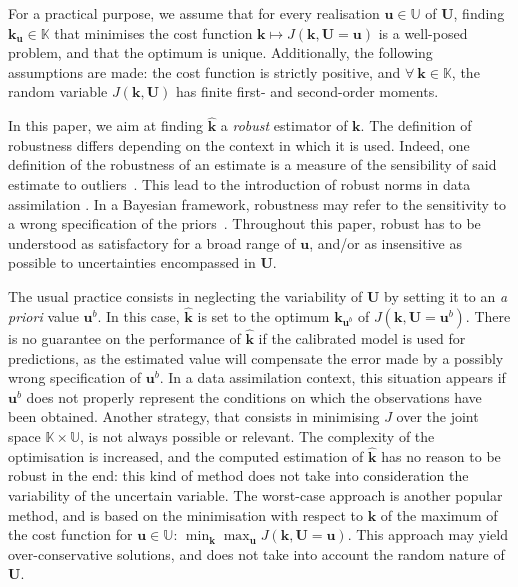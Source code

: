 \documentclass[preprint, review, 1p]{elsarticle}
\newcommand{\kest}{\hat{\mathbf{k}}}
\newcommand{\Kspace}{\mathbb{K}}
\newcommand{\Uspace}{\mathbb{U}}
\begin{document}
%
For a practical purpose, we assume that for every realisation $\mathbf{u}\in\Uspace$ of $\mathbf{U}$, %
finding ${\mathbf{k}}_{\mathbf{u}}\in \Kspace$ that minimises the cost function $\mathbf{k}\mapsto J(\mathbf{k}, \mathbf{U}=\mathbf{u})$ is a well-posed problem, and that the optimum is unique.
Additionally, the following assumptions are made: the cost function is strictly positive, and $\forall~  \mathbf{k} \in \Kspace$, the random variable $J(\mathbf{k},\mathbf{U})$ has finite first- and second-order moments. 
 
In this paper, we aim at finding $\kest$ a {\it robust\/} estimator of $\mathbf{k}$.
The definition of robustness differs depending on the context in which it is used. Indeed, one definition of the robustness of an estimate is a measure of the sensibility of said estimate to outliers~\citep{huber_robust_2011}. This lead to the introduction of robust norms in data assimilation \citep{rao_robust_2015}. %
In a Bayesian framework, robustness may refer to the sensitivity to a wrong specification of the priors~\citep{berger_overview_1994}.
%
Throughout this paper, 
robust has to be understood as satisfactory for a broad range of $\mathbf{u}$, and/or as insensitive as possible to uncertainties encompassed in $\mathbf{U}$.

The usual practice consists in neglecting the variability of $\mathbf{U}$ by setting it to an {\it a priori} value $\mathbf{u}^b$.
 In this case, $\kest$ is set to the optimum ${\mathbf{k}}_{\mathbf{u}^{b}} $ of $J(\mathbf{k}, \mathbf{U}=\mathbf{u}^b)$.  There is no guarantee on the performance of $\kest$ if the calibrated model is used for predictions, as the estimated value will compensate the error made by a possibly wrong specification of $\mathbf{u}^b$.
In a data assimilation context, this situation appears if $\mathbf{u}^b$ does not properly represent the conditions on which the observations have been obtained.
Another strategy, that consists in minimising $J$ over the joint space $\Kspace\times\Uspace$, is not always possible or relevant. The complexity of the optimisation is increased, and the computed estimation of $\kest$ has no reason to be robust in the end: this kind of method does not take into consideration the variability of the uncertain variable. 
%
The worst-case approach \citep{marzat_worst-case_2013} is another popular method, and is based on the minimisation with respect to $\mathbf{k}$ of the maximum of the cost function for $\mathbf{u}\in\Uspace$: $\min_{\mathbf{k}} \max_{\mathbf{u}} J(\mathbf{k}, \mathbf{U} = \mathbf{u})$. This approach may yield over-conservative solutions, and does not take into account the random nature of $\mathbf{U}$.%
\end{document}
